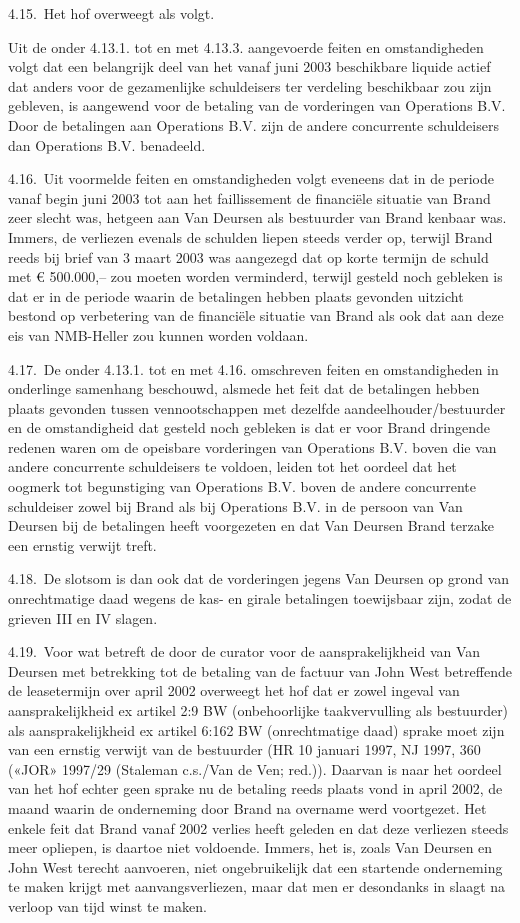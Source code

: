 \documentclass[
  dutch,
  a4paper,
]{article}
\begin{document}
4.15. Het hof overweegt als volgt.

Uit de onder 4.13.1. tot en met 4.13.3. aangevoerde feiten en omstandigheden volgt dat een belangrijk deel van het vanaf juni 2003 beschikbare liquide actief dat anders voor de gezamenlijke schuldeisers ter verdeling beschikbaar zou zijn gebleven, is aangewend voor de betaling van de vorderingen van Operations B.V. Door de betalingen aan Operations B.V. zijn de andere concurrente schuldeisers dan Operations B.V. benadeeld.

4.16. Uit voormelde feiten en omstandigheden volgt eveneens dat in de periode vanaf begin juni 2003 tot aan het faillissement de financiële situatie van Brand zeer slecht was, hetgeen aan Van Deursen als bestuurder van Brand kenbaar was. Immers, de verliezen evenals de schulden liepen steeds verder op, terwijl Brand reeds bij brief van 3 maart 2003 was aangezegd dat op korte termijn de schuld met € 500.000,-- zou moeten worden verminderd, terwijl gesteld noch gebleken is dat er in de periode waarin de betalingen hebben plaats gevonden uitzicht bestond op verbetering van de financiële situatie van Brand als ook dat aan deze eis van NMB-Heller zou kunnen worden voldaan.

4.17. De onder 4.13.1. tot en met 4.16. omschreven feiten en omstandigheden in onderlinge samenhang beschouwd, alsmede het feit dat de betalingen hebben plaats gevonden tussen vennootschappen met dezelfde aandeelhouder/bestuurder en de omstandigheid dat gesteld noch gebleken is dat er voor Brand dringende redenen waren om de opeisbare vorderingen van Operations B.V. boven die van andere concurrente schuldeisers te voldoen, leiden tot het oordeel dat het oogmerk tot begunstiging van Operations B.V. boven de andere concurrente schuldeiser zowel bij Brand als bij Operations B.V. in de persoon van Van Deursen bij de betalingen heeft voorgezeten en dat Van Deursen Brand terzake een ernstig verwijt treft.

4.18. De slotsom is dan ook dat de vorderingen jegens Van Deursen op grond van onrechtmatige daad wegens de kas- en girale betalingen toewijsbaar zijn, zodat de grieven III en IV slagen.

4.19. Voor wat betreft de door de curator voor de aansprakelijkheid van Van Deursen met betrekking tot de betaling van de factuur van John West betreffende de leasetermijn over april 2002 overweegt het hof dat er zowel ingeval van aansprakelijkheid ex artikel 2:9 BW (onbehoorlijke taakvervulling als bestuurder) als aansprakelijkheid ex artikel 6:162 BW (onrechtmatige daad) sprake moet zijn van een ernstig verwijt van de bestuurder (HR 10 januari 1997, NJ 1997, 360 («JOR» 1997/29 (Staleman c.s./Van de Ven; red.)). Daarvan is naar het oordeel van het hof echter geen sprake nu de betaling reeds plaats vond in april 2002, de maand waarin de onderneming door Brand na overname werd voortgezet. Het enkele feit dat Brand vanaf 2002 verlies heeft geleden en dat deze verliezen steeds meer opliepen, is daartoe niet voldoende. Immers, het is, zoals Van Deursen en John West terecht aanvoeren, niet ongebruikelijk dat een startende onderneming te maken krijgt met aanvangsverliezen, maar dat men er desondanks in slaagt na verloop van tijd winst te maken.
\end{document}
